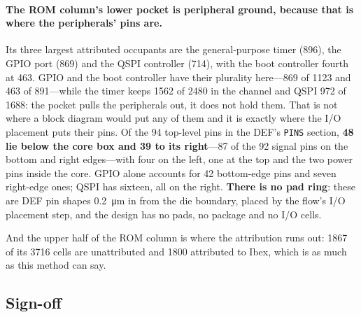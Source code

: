 \documentclass[11pt,a4paper]{article}
\begin{document}
\paragraph{The ROM column's lower pocket is peripheral ground, because
that is where the peripherals' pins are.} Its three largest attributed occupants
are the general-purpose timer (\num{896}), the GPIO port (\num{869})
and the QSPI controller (\num{714}), with the boot controller fourth at
\num{463}. GPIO and the boot controller have their plurality
here---\num{869} of \num{1123} and \num{463} of \num{891}---while the
timer keeps \num{1562} of \num{2480} in the channel and QSPI \num{972}
of \num{1688}: the pocket pulls the peripherals out, it does not hold
them. That is not where a block
diagram would put any of them and it is exactly where the I/O placement
puts their pins. Of
the \num{94} top-level pins in the DEF's \texttt{PINS} section,
\textbf{\num{48} lie below the core box and \num{39} to its
right}---\num{87} of the \num{92} signal pins on the bottom and right
edges---with four on the left, one at the top and the two power pins
inside the core. GPIO alone accounts for \num{42} bottom-edge pins and
seven right-edge ones; QSPI has sixteen, all on the right.
\textbf{There is no pad ring}: these are DEF pin shapes
\SI{0.2}{\um} in from the die boundary, placed by the flow's
I/O placement step, and the design has no pads, no package and no I/O
cells.

And the upper half of the ROM column is where the attribution runs out:
\num{1867} of its \num{3716} cells are unattributed and \num{1800}
attributed to Ibex, which is as much as this method can say.


\subsection{Sign-off}
\end{document}
